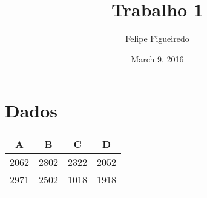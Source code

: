 \documentclass[]{article}
\title{Trabalho 1}
\author{Felipe Figueiredo}
\date{March 9, 2016}
\begin{document}
\maketitle


\section{Dados}\label{dados}

\begin{longtable}[c]{@{}cccc@{}}
\toprule
\begin{minipage}[b]{0.06\columnwidth}\centering\strut
A
\strut\end{minipage} &
\begin{minipage}[b]{0.06\columnwidth}\centering\strut
B
\strut\end{minipage} &
\begin{minipage}[b]{0.06\columnwidth}\centering\strut
C
\strut\end{minipage} &
\begin{minipage}[b]{0.06\columnwidth}\centering\strut
D
\strut\end{minipage}\tabularnewline
\midrule
\endhead
\begin{minipage}[t]{0.06\columnwidth}\centering\strut
2062
\strut\end{minipage} &
\begin{minipage}[t]{0.06\columnwidth}\centering\strut
2802
\strut\end{minipage} &
\begin{minipage}[t]{0.06\columnwidth}\centering\strut
2322
\strut\end{minipage} &
\begin{minipage}[t]{0.06\columnwidth}\centering\strut
2052
\strut\end{minipage}\tabularnewline
\begin{minipage}[t]{0.06\columnwidth}\centering\strut
2971
\strut\end{minipage} &
\begin{minipage}[t]{0.06\columnwidth}\centering\strut
2502
\strut\end{minipage} &
\begin{minipage}[t]{0.06\columnwidth}\centering\strut
1018
\strut\end{minipage} &
\begin{minipage}[t]{0.06\columnwidth}\centering\strut
1918
\strut\end{minipage}\tabularnewline
\begin{minipage}[t]{0.06\columnwidth}\centering\strut

\end{minipage}
\end{longtable}
\end{document}
